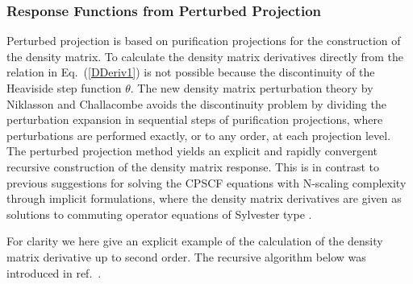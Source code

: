 \documentclass[prl,aps,letterpaper,twocolumn,showpacs,twocolumngrid,superbib]{revtex4}
\begin{document}
\newpage

\subsubsection{Response Functions from Perturbed Projection}\label{ResponseFunctions}

Perturbed projection is based on purification projections for the 
construction of the density matrix. To calculate the
density matrix derivatives directly from the relation in Eq.\ (\ref{DDeriv1})
is not possible because the discontinuity of the Heaviside step function $\theta$.
The new density matrix perturbation theory by Niklasson and Challacombe
\cite{ANiklasson04} avoids the discontinuity problem
by dividing the perturbation expansion in sequential steps of 
purification projections, where perturbations are performed exactly, or to 
any order, at each projection level. The perturbed projection method yields
an explicit and rapidly convergent recursive construction of
the density matrix response. This is in contrast to previous suggestions for
solving the CPSCF equations with N-scaling complexity through implicit
formulations, where the density matrix derivatives are given as solutions
to commuting operator equations of Sylvester type 
\cite{Ochsenfeld97,Helgaker_2001}.


For clarity we here give an explicit example of the calculation
of the density matrix derivative up to second order. The recursive
algorithm below was introduced in ref.\ \cite{ANiklasson04}.
\end{document}
